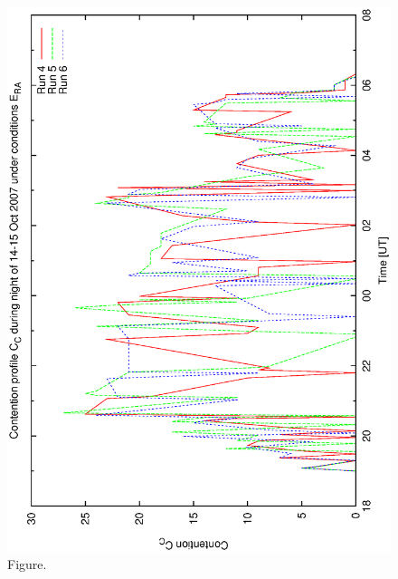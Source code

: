 \documentclass[12pt,a4paper]{article}
\begin{document}
\begin{figure}[htbp]
 \begin{center}
  \includegraphics[scale=1.0, angle=0]{figures/bsa_rnd2_cont.eps}
 \end{center}
  \caption[Figure.]
{Figure.}
\end{figure}
\clearpage
\end{document}
